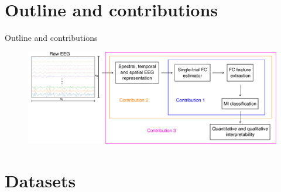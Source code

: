 \documentclass[aspectratio=169]{beamer}
\begin{document}
\section{Outline and contributions}

\begin{frame}{Outline and contributions}
    \begin{figure}[h!]
        \centering
        \includegraphics[scale=0.65]{../Tesis_document/Figures/outline_and_contributions/general_contributions.pdf}
    \end{figure}
\end{frame}

\section{Datasets}
\end{document}
